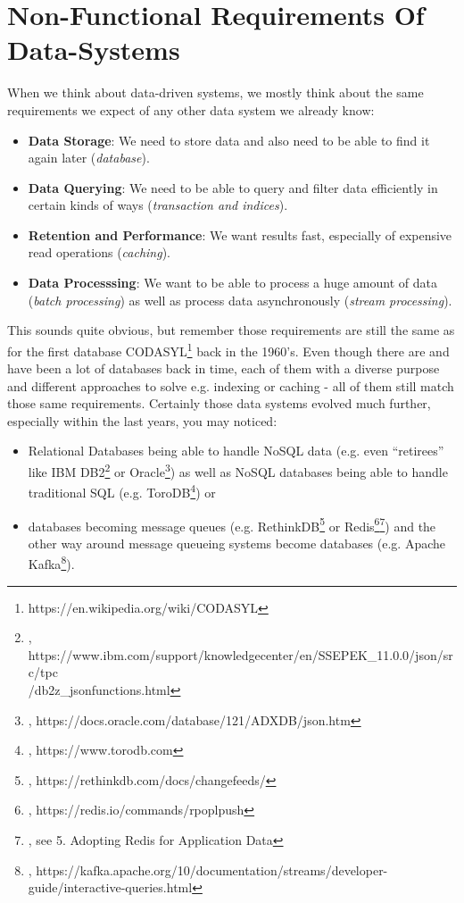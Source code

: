 \section{Non-Functional Requirements Of Data-Systems}
\label{tf_nfreq}
When we think about data-driven systems, we mostly think about the same requirements we expect of any other data system we already know:
\begin{itemize}
	\item \textbf{Data Storage}: We need to store data and also need to be able to find it again later (\textit{database}). 
	\item \textbf{Data Querying}: We need to be able to query and filter data efficiently in certain kinds of ways (\textit{transaction and indices}).
	\item \textbf{Retention and Performance}: We want results fast, especially of expensive read operations (\textit{caching}).
	\item \textbf{Data Processsing}: We want to be able to process a huge amount of data (\textit{batch processing}) as well as process data asynchronously (\textit{stream processing}).\\
\end{itemize}

This sounds quite obvious, but remember those requirements are still the same as for the first database CODASYL\footnote{https://en.wikipedia.org/wiki/CODASYL} back in the 1960's. Even though there are and have been a lot of databases back in time, each of them with a diverse purpose and different approaches to solve e.g. indexing or caching - all of them still match those same requirements. Certainly those data systems evolved much further, especially within the last years, you may noticed:
\begin{itemize}
	\item Relational Databases being able to handle NoSQL data (e.g. even ``retirees'' like IBM DB2\footnote{\cite{IBMDB2JS}, https://www.ibm.com/support/knowledgecenter/en/SSEPEK\_11.0.0/json/src/tpc\\/db2z\_jsonfunctions.html} or Oracle\footnote{\cite{ORCLJS}, https://docs.oracle.com/database/121/ADXDB/json.htm}) as well as NoSQL databases being able to handle traditional SQL (e.g. ToroDB\footnote{\cite{TORODB}, https://www.torodb.com}) or
	\item databases becoming message queues (e.g. RethinkDB\footnote{\cite{RDBMQ}, https://rethinkdb.com/docs/changefeeds/} or Redis\footnote{\cite{RUDMQ}, https://redis.io/commands/rpoplpush}\footnote{\cite{BSARN}, see 5. Adopting Redis for Application Data}) and the other way around message queueing systems become databases (e.g. Apache Kafka\footnote{\cite{KFKQU}, https://kafka.apache.org/10/documentation/streams/developer-guide/interactive-queries.html}).\\
\end{itemize}

